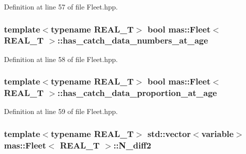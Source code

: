 Definition at line 57 of file Fleet.\-hpp.

\hypertarget{structmas_1_1_fleet_ab292045bcb9dd21ab25a0b6f2404e351}{
\subsubsection[{has\-\_\-catch\-\_\-data\-\_\-numbers\-\_\-at\-\_\-age}]{\setlength{\rightskip}{0pt plus 5cm}template$<$typename R\-E\-A\-L\-\_\-\-T$>$ bool {\bf mas\-::\-Fleet}$<$ R\-E\-A\-L\-\_\-\-T $>$\-::has\-\_\-catch\-\_\-data\-\_\-numbers\-\_\-at\-\_\-age}}\label{structmas_1_1_fleet_ab292045bcb9dd21ab25a0b6f2404e351}


Definition at line 58 of file Fleet.\-hpp.

\hypertarget{structmas_1_1_fleet_af74c0ec58026828cd286f6f4c317e517}{
\subsubsection[{has\-\_\-catch\-\_\-data\-\_\-proportion\-\_\-at\-\_\-age}]{\setlength{\rightskip}{0pt plus 5cm}template$<$typename R\-E\-A\-L\-\_\-\-T$>$ bool {\bf mas\-::\-Fleet}$<$ R\-E\-A\-L\-\_\-\-T $>$\-::has\-\_\-catch\-\_\-data\-\_\-proportion\-\_\-at\-\_\-age}}\label{structmas_1_1_fleet_af74c0ec58026828cd286f6f4c317e517}


Definition at line 59 of file Fleet.\-hpp.

\hypertarget{structmas_1_1_fleet_a43e9e4e070b2a3d7ab2c9a0ab59b1d15}{
\subsubsection[{N\-\_\-diff2}]{\setlength{\rightskip}{0pt plus 5cm}template$<$typename R\-E\-A\-L\-\_\-\-T$>$ std\-::vector$<${\bf variable}$>$ {\bf mas\-::\-Fleet}$<$ R\-E\-A\-L\-\_\-\-T $>$\-::N\-\_\-diff2}}\label{structmas_1_1_fleet_a43e9e4e070b2a3d7ab2c9a0ab59b1d15}


